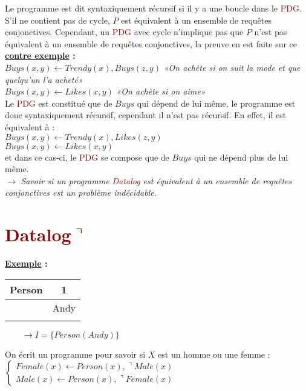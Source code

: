 \documentclass{article}
\newcommand{\red}[1]{\textcolor{darkred}{#1}}
\begin{document}
Le programme est dit syntaxiquement récursif si il y a une boucle dans le \red{PDG}. S'il ne contient pas de cycle, $P$ est équivalent à un ensemble de requêtes conjonctives. 
Cependant, un \red{PDG} avec cycle n'implique pas que $P$ n'est pas équivalent à un ensemble de requêtes conjonctives, la preuve en est faite sur ce 
\textbf{\underline{contre exemple} :} \\

\noindent $Buys(x,y)\leftarrow Trendy(x), Buys(z,y)$ \textit{«On achète si on suit la mode et que quelqu'un l'a acheté»} \\
$Buys(x,y)\leftarrow Likes(x,y)$ \textit{«On achète si on aime»} \\

\noindent Le \red{PDG} est constitué que de $Buys$ qui dépend de lui même, le programme est donc syntaxiquement récursif, cependant il n'est pas récursif. En effet, il est 
équivalent à : \\

\noindent$Buys(x,y)\leftarrow Trendy(x), Likes(z,y)$ \\
$Buys(x,y)\leftarrow Likes(x,y)$\\

\noindent et dans ce cas-ci, le \red{PDG} se compose que de $Buys$ qui ne dépend plus de lui même.\\
$\rightarrow$ \textit{Savoir si un programme \red{Datalog} est équivalent à un ensemble de requêtes conjonctives est un problème indécidable.}

\section{\red{Datalog$\urcorner$}}

\textbf{\underline{Exemple} : } \\
\begin{center}
	\begin{tabular}{r|c}
	Person & 1\\
	\hline
	& Andy \\
	& \\
	\end{tabular}
	$\qquad \rightarrow I = \{Person(Andy)\}$
\end{center}

\noindent On écrit un programme pour savoir si $X$ est un homme ou une femme : 
$\left\{ \begin{array}{l}
Female(x) \leftarrow Person(x), \urcorner Male(x) \\
Male(x) \leftarrow Person(x), \urcorner Female(x)
\end{array} \right.$\\
\end{document}
